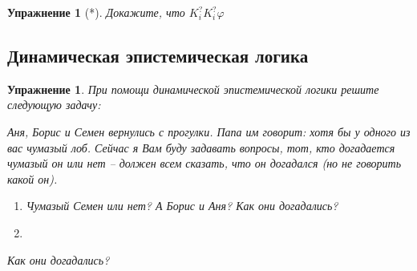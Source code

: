 \documentclass[11pt]{article}
\newtheorem{exercise}[theorem]{Упражнение}
\begin{document}
\begin{exercise}[*] Докажите, что $K^?_iK^?_i\varphi$
\end{exercise}


\subsection{Динамическая эпистемическая логика}


\begin{exercise} При помощи динамической эпистемической логики решите следующую задачу:

Аня, Борис и Семен вернулись с прогулки. Папа им говорит: хотя бы у одного из вас  чумазый лоб. Сейчас я Вам буду задавать вопросы, тот, кто догадается чумазый он или нет – должен всем сказать, что он догадался (но не говорить какой он).

\begin{enumerate}
	\item 
{}
\begin{center}
Чумазый Семен или нет? А Борис и Аня? Как они догадались?	
\end{center}

\item 

\end{enumerate}

\begin{center}
Как они догадались?	
\end{center}
\end{exercise}
\end{document}
